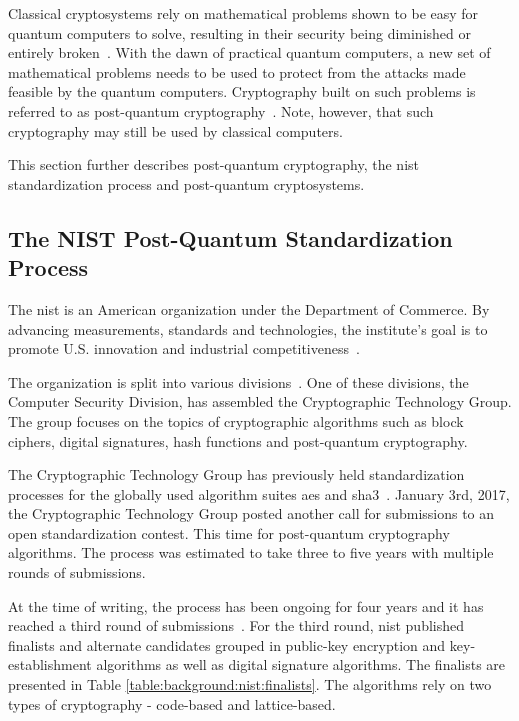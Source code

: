 Classical cryptosystems rely on mathematical problems shown to be easy for quantum computers to solve, resulting in their security being diminished or entirely broken~\cite{shor1997, jordan2021}. With the dawn of practical quantum computers, a new set of mathematical problems needs to be used to protect from the attacks made feasible by the quantum computers. Cryptography built on such problems is referred to as \gls{post-quantum} cryptography~\cite{nist:round-three-submissions}. Note, however, that such cryptography may still be used by classical computers. 

This section further describes \gls{post-quantum} cryptography, the \gls{nist} standardization process and \gls{post-quantum} cryptosystems.

\subsection{The NIST Post-Quantum Standardization Process}
The \acrfull{nist} is an American organization under the Department of Commerce. By advancing measurements, standards and technologies, the institute's goal is to promote U.S. innovation and industrial competitiveness~\cite{nist:about}.

The organization is split into various divisions~\cite{nist:ct}. One of these divisions, the Computer Security Division, has assembled the Cryptographic Technology Group. The group focuses on the topics of cryptographic algorithms such as block ciphers, digital signatures, hash functions and \gls{post-quantum} cryptography.

The Cryptographic Technology Group has previously held standardization processes for the globally used algorithm suites \gls{aes} and \gls{sha3}~\cite{nist:call-for-proposals}. January 3rd, 2017, the Cryptographic Technology Group posted another call for submissions to an open standardization contest. This time for \gls{post-quantum} cryptography algorithms. The process was estimated to take three to five years with multiple rounds of submissions.

At the time of writing, the process has been ongoing for four years and it has reached a third round of submissions~\cite{nist:round-three-submissions}. For the third round, \gls{nist} published finalists and alternate candidates grouped in public-key encryption and key-establishment algorithms as well as digital signature algorithms. The finalists are presented in Table \ref{table:background:nist:finalists}. The algorithms rely on two types of cryptography - code-based and lattice-based.

